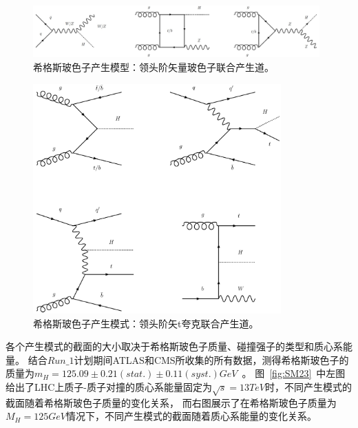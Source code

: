 \begin{figure}
  \begin{center}
    \includegraphics[width=0.98\textwidth]{figuresTHE/WZH.jpg}
  \end{center}
  \caption{
希格斯玻色子产生模型：领头阶矢量玻色子联合产生道。
}
    \label{fig:WZH}
\end{figure}

\begin{figure}
  \begin{center}
    \includegraphics[width=0.85\textwidth]{figuresTHE/ttH.pdf}
  \end{center}
  \caption{
希格斯玻色子产生模式：领头阶矢t夸克联合产生道。
}
    \label{fig:ttH}
\end{figure}

各个产生模式的截面的大小取决于希格斯玻色子质量、碰撞强子的类型和质心系能量。
结合$Run\_1$计划期间ATLAS和CMS所收集的所有数据，测得希格斯玻色子的质量为$m_H=125.09\pm 0.21(stat.)\pm 0.11(syst.)GeV$~\cite{HIGGSMASS}。
图~\ref{fig:SM23}~中左图给出了LHC上质子-质子对撞的质心系能量固定为$\sqrt{s}=13TeV$时，不同产生模式的截面随着希格斯玻色子质量的变化关系，
而右图展示了在希格斯玻色子质量为$M_H=125GeV$情况下，不同产生模式的截面随着质心系能量的变化关系。


